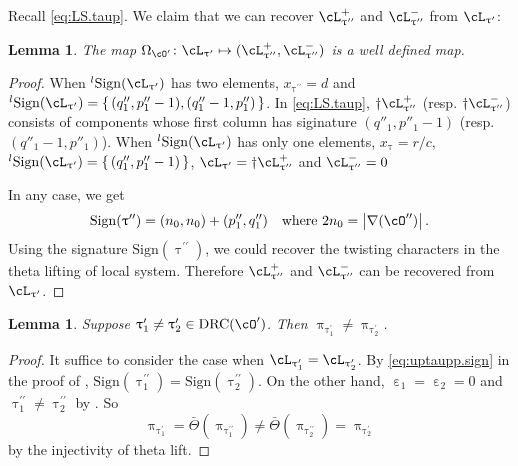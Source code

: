 \documentclass[12pt,a4paper]{amsart}
\newcommand{\trivial}[2][]{\if\relax\detokenize{#1}\relax
  {%
      \color{orange} \vspace{0em} $[$  #2 $]$
      \color{black}
  }
  \else
\ifx#1h
\ifcsname showtrivial\endcsname
{%
    \color{orange} \vspace{0em}  $[$ #2 $]$
    \color{black}
}
\fi
\else {\red Wrong argument!} \fi
\fi
}
\def\abs#1{\left|{#1}\right|}
\def\DD{\nabla}
\numberwithin{equation}{section}
\newtheorem{lem}[thm]{Lemma}
\theoremstyle{remark}
\def\half{{\tfrac{1}{2}}}
\def\lsign{{}^l\mathrm{Sign}}
\def\ssign{\mathrm{Sign}}
\def\Thetab{\bar{\Theta}}
\def\drc{\mathrm{DRC}}
\def\cOp{\cO^{\prime}}
\def\cOpp{\cO^{\prime\prime}}
\def\pcL{\cL^+}
\def\ncL{\cL^-}
\def\uptaup{\uptau^{\prime}}
\def\uptaupp{\uptau^{\prime\prime}}
\begin{document}
Recall \eqref{eq:LS.taup}.
We claim that we can recover $\pcL_{\uptaupp}$ and
$\ncL_{\uptaupp}$ from $\cL_{\uptaup}$:
\begin{lem}\label{c:gd.C1}
  The map $\Omega_{\cOp}\colon \cL_{\uptaup}\mapsto (\pcL_{\uptaupp},\ncL_{\uptaupp})$ is a well
  defined map.
\end{lem}
\begin{proof}
  When $\lsign(\cL_{\uptaup})$ has two elements, $x_{\uptaupp}=d$ and
  $\lsign(\cL_{\uptaup}) = \set{(q''_{1},p''_{1}-1),(q''_{1}-1,p''_{1})}$. In
  \eqref{eq:LS.taup}, $\dagger\pcL_{\uptaupp}$ (resp. $\dagger\ncL_{\uptaupp}$)
  consists of components whose first column has siginature $(q''_{1},p''_{1}-1)$
  (resp. $(q''_{1}-1,p''_{1})$). When $\lsign(\cL_{\uptaup})$ has only one
  elements, $x_{\uptau}=r/c$,
  $\lsign(\cL_{\uptaup}) = \set{(q''_{1},p''_{1}-1)}$,
  $\cL_{\uptaup} = \dagger\pcL_{\uptaupp}$ and $\ncL_{\uptaupp}=0$

  In any case, we get
  \begin{equation}\label{eq:uptaupp.sign}
    \ssign(\uptaupp) = (n_{0},n_{0})+(p''_{1},q''_{1})\quad \text{where }
    2n_{0} = \abs{\DD(\cOpp)}.
  \end{equation}
  Using the signature $\ssign(\uptaupp)$, we could recover the twisting
  characters in the theta lifting of local system. Therefore
  $\pcL_{\uptaupp}$ and $\ncL_{\uptaupp}$ can be recovered from  $\cL_{\uptaup}$.
\end{proof}


\begin{lem}\label{c:gd.C3}
  Suppose $\uptaup_{1}\neq \uptaup_{2}\in \drc(\cOp)$. Then
  $\uppi_{\uptaup_{1}}\neq \uppi_{\uptaup_{2}}$.
\end{lem}
\begin{proof}
  It suffice to consider the case when $\cL_{\uptaup_{1}} = \cL_{\uptaup_{2}}$.
 By \eqref{eq:uptaupp.sign} in the proof of ,
 $\ssign(\uptaupp_{1}) = \ssign(\uptaupp_{2})$.
 On the other hand, $\upepsilon_{1}=\upepsilon_{2}=0$ and
 $\uptaupp_{1}\neq \uptaupp_{2}$ by . So
 \[
   \uppi_{\uptaup_{1}} = \Thetab(\uppi_{\uptaupp_{1}})\neq\Thetab(\uppi_{\uptaupp_{2}}) = \uppi_{\uptaup_{2}}
 \]
  by the injectivity of theta lift.
\end{proof}
\end{document}
